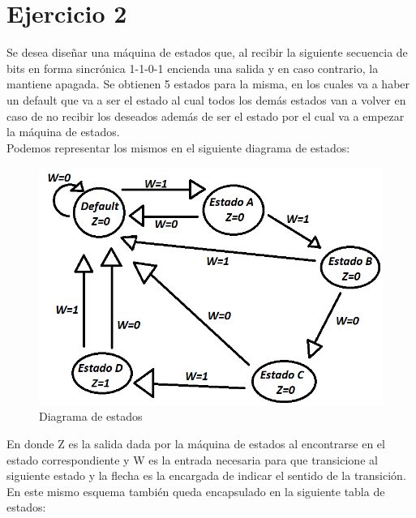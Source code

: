 \chapter{Ejercicio 2}
Se desea diseñar una máquina de estados que, al recibir la siguiente secuencia de bits en forma sincrónica 1-1-0-1 encienda una salida y en caso contrario, la mantiene apagada. Se obtienen 5 estados para la misma, en los cuales va a haber un default que va a ser el estado al cual todos los demás estados van a volver en caso de no recibir los deseados además de ser el estado por el cual va a empezar la máquina de estados.\\
Podemos representar los mismos en el siguiente diagrama de estados:\\
\begin{figure}[h!]
	\label{f:Moore}
	\centering
	\includegraphics[scale=0.4]{../Ejercicio-2/Diagrama_de_estados.png}
	\caption{Diagrama de estados}
\end{figure}
En donde Z es la salida dada por la máquina de estados al encontrarse en el estado correspondiente y W es la entrada necesaria para que transicione al siguiente estado y la flecha es la encargada de indicar el sentido de la transición.\\
En este mismo esquema también queda encapsulado en la siguiente tabla de estados:\\
\FloatBarrier
